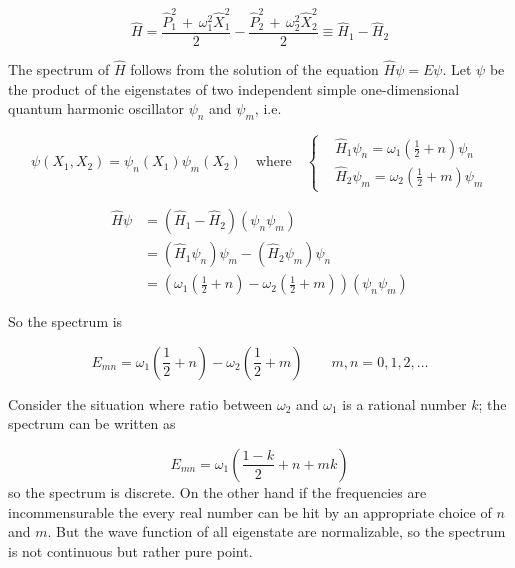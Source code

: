 \begin{equation} \label{eq:Ham-QPU-HO}
  \hat{H} =
  \frac{\hat{P}_1^2 \, + \, \omega_1^2 \hat{X}_1^2}{2} -
  \frac{\hat{P}_2^2 \, + \, \omega_2^2 \hat{X}_2^2}{2} \equiv
  \hat{H}_1 - \hat{H}_2
\end{equation}

The spectrum of $\hat{H}$ follows from the solution of the equation
$\hat{H} \psi = E \psi$. Let $\psi$ be the product of the eigenstates of two
independent simple one-dimensional quantum harmonic oscillator $\psi_n$ and
$\psi_m$, i.e.

\begin{equation*}
  \psi(X_1, X_2) = \psi_n(X_1) \psi_m(X_2)
  \quad \text{where} \quad
  \begin{cases}
    &\hat{H}_1\psi_n = \omega_1 \left( \frac{1}{2} + n \right)\psi_n \\
    &\hat{H}_2\psi_m = \omega_2 \left( \frac{1}{2} + m \right)\psi_m
  \end{cases}
\end{equation*}

\begin{align*}
  \hat{H} \psi
  &= \left(\hat{H}_1 - \hat{H}_2\right) \left(\psi_n \psi_m\right) \\
  &= \left(\hat{H}_1\psi_n\right)\psi_m - \left(\hat{H}_2\psi_m\right)\psi_n \\
  &= \left(
    \omega_1\left(\frac{1}{2} + n\right) -
    \omega_2\left(\frac{1}{2} + m\right)
     \right) \left(\psi_n\psi_m\right)
\end{align*}



So the spectrum is

\begin{equation}
  E_{mn} =
  \omega_1 \left( \frac{1}{2} + n \right) -
  \omega_2 \left( \frac{1}{2} + m \right)
  \qquad m,n = 0,1,2,\ldots
\end{equation}

Consider the situation where ratio between $\omega_2$ and $\omega_1$ is a
rational number $k$; the spectrum can be written as

\begin{equation*}
  E_{mn} = \omega_1 \left( \frac{1-k}{2} + n + mk \right)
\end{equation*}
so the spectrum is discrete. On the other hand if the frequencies are
incommensurable the every real number can be hit by an appropriate choice of
$n$ and $m$. But the wave function of all eigenstate are normalizable, so the
spectrum is not continuous but rather pure point. \\


